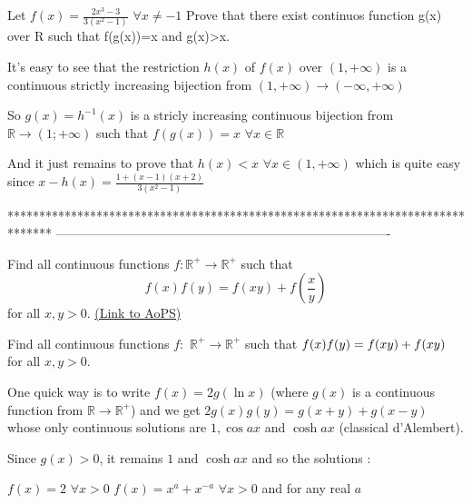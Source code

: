 \begin{solution}
	\begin{tcolorbox}Let $f(x)=\frac{2x^{3}-3}{3(x^{2}-1)} $ $\forall x\neq -1$
Prove that there exist continuos function g(x) over R such that f(g(x))=x and g(x)>x.\end{tcolorbox}
It's easy to see that the restriction $h(x)$ of $f(x)$ over $(1,+\infty)$ is a continuous strictly increasing bijection from $(1,+\infty)\to(-\infty,+\infty)$

So $g(x)=h^{-1}(x)$ is a stricly increasing continuous bijection from $\mathbb R\to(1;+\infty)$ such that $f(g(x))=x$ $\forall x\in\mathbb R$

And it just remains to prove that $h(x)<x$ $\forall x\in(1,+\infty)$ which is quite easy since $x-h(x)=\frac{1+(x-1)(x+2)}{3(x^2-1)}$
\end{solution}
*******************************************************************************
-------------------------------------------------------------------------------

\begin{problem}
	Find all continuous functions $f: \mathbb{R}^+ \to \mathbb{R}^+$ such that \[f(x)f(y)=f(xy)+f\left(\frac xy\right)\] for all $x,y>0$.
	\flushright \href{https://artofproblemsolving.com/community/c6h445373}{(Link to AoPS)}
\end{problem}



\begin{solution}
	\begin{tcolorbox}Find all continuous functions $f:$ $\mathbb R^+\to \mathbb R^+$ such that $f(x)f(y)=f(xy)+f(x\/y)$ for all $x,y>0$.\end{tcolorbox}
One quick way is to write $f(x)=2g(\ln x)$ (where $g(x)$ is a continuous function from $\mathbb R\to\mathbb R^+$) and we get $2g(x)g(y)=g(x+y)+g(x-y)$ whose only continuous solutions are $1,\cos ax$ and $\cosh ax$ (classical d'Alembert).

Since $g(x)>0$, it remains $1$ and $\cosh ax$ and so the solutions :

$f(x)=2$ $\forall x>0$
$f(x)=x^a+x^{-a}$ $\forall x>0$ and for any real $a$
\end{solution}



